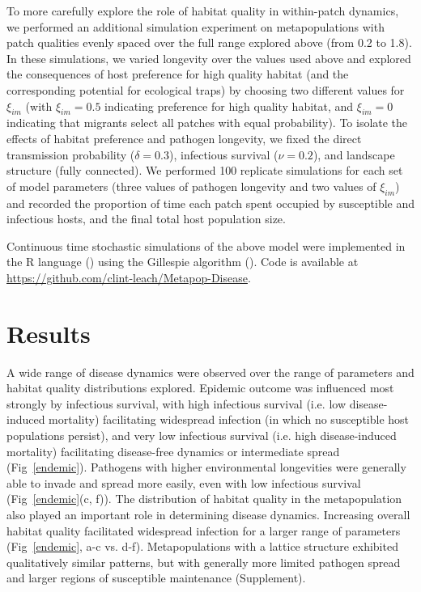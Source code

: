 \documentclass{article}
\begin{document}
To more carefully explore the role of habitat quality in within-patch dynamics, we performed an additional simulation experiment on metapopulations with patch qualities evenly spaced over the full range explored above (from 0.2 to 1.8).
In these simulations, we varied longevity over the values used above and explored the consequences of host preference for high quality habitat (and the corresponding potential for ecological traps) by choosing two different values for $\xi_{im}$ (with $\xi_{im} = 0.5$ indicating preference for high quality habitat, and  $\xi_{im} = 0$ indicating that migrants select all patches with equal probability).  
To isolate the effects of habitat preference and pathogen longevity, we fixed the direct transmission probability ($\delta = 0.3$), infectious survival ($\nu = 0.2$), and landscape structure (fully connected).
We performed 100 replicate simulations for each set of model parameters (three values of pathogen longevity and two values of $\xi_{im}$) and recorded the proportion of time each patch spent occupied by susceptible and infectious hosts, and the final total host population size.

Continuous time stochastic simulations of the above model were implemented in the R language (\cite{R2014}) using the Gillespie algorithm (\cite{Gillespie1977}).  Code is available at \\
\url{https://github.com/clint-leach/Metapop-Disease}.

\section{Results}
\label{results}

A wide range of disease dynamics were observed over the range of parameters and habitat quality distributions explored.  
Epidemic outcome was influenced most strongly by infectious survival, with high infectious survival (i.e. low disease-induced mortality) facilitating widespread infection (in which no susceptible host populations persist), and very low infectious survival (i.e. high disease-induced mortality) facilitating disease-free dynamics or intermediate spread (Fig~\ref{endemic}). 
Pathogens with higher environmental longevities were generally able to invade and spread more easily, even with low infectious survival (Fig~\ref{endemic}(c, f)).  
The distribution of habitat quality in the metapopulation also played an important role in determining disease dynamics.  Increasing overall habitat quality facilitated widespread infection for a larger range of parameters (Fig~\ref{endemic}, a-c vs. d-f).
Metapopulations with a lattice structure exhibited qualitatively similar patterns, but with generally more limited pathogen spread and larger regions of susceptible maintenance (Supplement).
\end{document}
